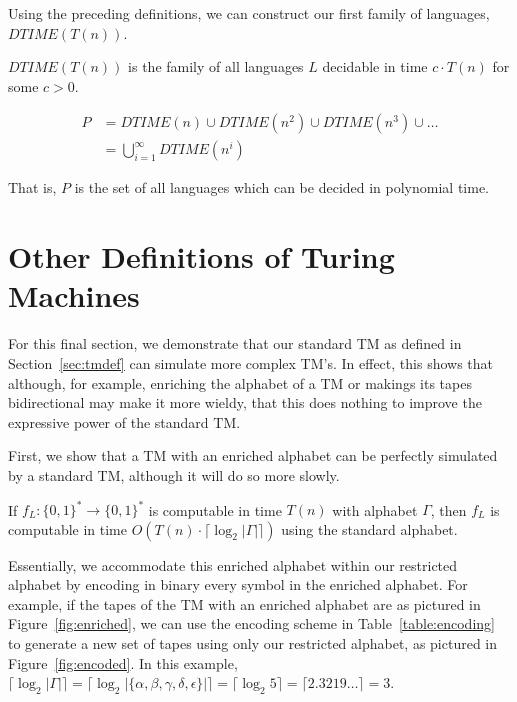 \documentclass[usletter]{article}
\begin{document}
Using the preceding definitions, we can construct our first family of languages, $DTIME(T(n))$.

\begin{definition}
$DTIME(T(n))$ is the family of all languages $L$ decidable in time $c\cdot T(n)$ for some $c>0$.
\end{definition}

\begin{definition}
\begin{align}
P &= DTIME(n) \cup DTIME(n^2) \cup DTIME(n^3) \cup \dots\\
&= \bigcup\limits_{i=1}^{\infty} DTIME(n^i)
\end{align}
\end{definition}

That is, $P$ is the set of all languages which can be decided in polynomial time.

\section{Other Definitions of Turing Machines}

For this final section, we demonstrate that our standard TM as defined in Section~\ref{sec:tmdef} can simulate more complex TM's. In effect, this shows that although, for example, enriching the alphabet of a TM or makings its tapes bidirectional may make it more wieldy, that this does nothing to improve the expressive power of the standard TM.

First, we show that a TM with an enriched alphabet can be perfectly simulated by a standard TM, although it will do so more slowly.

\begin{definition}
If $f_L : \{0,1\}^* \rightarrow \{0,1\}^*$ is computable in time $T(n)$ with alphabet $\Gamma$, then $f_L$ is computable in time $O(T(n)\cdot \lceil\log_2|\Gamma|\rceil)$ using the standard alphabet.
\end{definition}

Essentially, we accommodate this enriched alphabet within our restricted alphabet by encoding in binary every symbol in the enriched alphabet. For example, if the tapes of the TM with an enriched alphabet are as pictured in Figure~\ref{fig:enriched}, we can use the encoding scheme in Table~\ref{table:encoding} to generate a new set of tapes using only our restricted alphabet, as pictured in Figure~\ref{fig:encoded}. In this example, $\lceil\log_2|\Gamma|\rceil = \lceil\log_2|\{\alpha,\beta,\gamma,\delta,\epsilon\}|\rceil = \lceil\log_2 5\rceil = \lceil 2.3219\dots\rceil = 3$.
\end{document}
